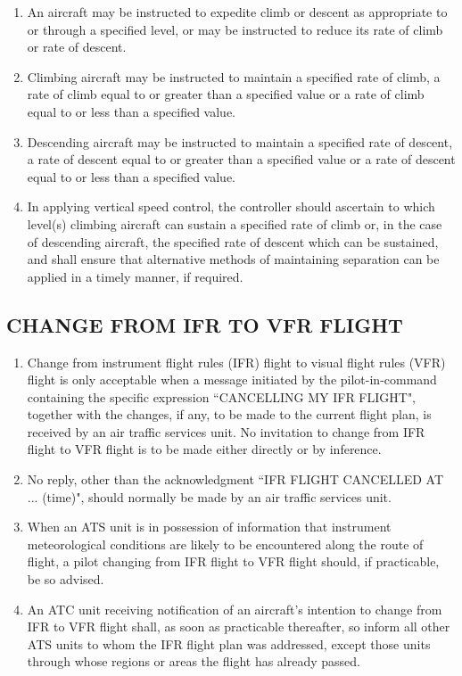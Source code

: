 \documentclass[../vATM.tex]{subfiles}
\begin{document}
    \begin{enumerate}
        \item An aircraft may be instructed to expedite climb or descent as appropriate to or through a specified level, or may be instructed to reduce its rate of climb or rate of descent.
        \item Climbing aircraft may be instructed to maintain a specified rate of climb, a rate of climb equal to or greater than a specified value or a rate of climb equal to or less than a specified value.
        \item Descending aircraft may be instructed to maintain a specified rate of descent, a rate of descent equal to or greater than a specified value or a rate of descent equal to or less than a specified value.
        \item In applying vertical speed control, the controller should ascertain to which level(s) climbing aircraft can sustain a specified rate of climb or, in the case of descending aircraft, the specified rate of descent which can be sustained, and shall ensure that alternative methods of maintaining separation can be applied in a timely manner, if required.
    \end{enumerate}

    \subsection[Change from IFR to VFR flight]{CHANGE FROM IFR TO VFR FLIGHT}

    \begin{enumerate}[label=\arabic{section}.\arabic{subsection}.\arabic*]
        \item Change from instrument flight rules (IFR) flight to visual flight rules (VFR) flight is only acceptable when a message initiated by the pilot-in-command containing the specific expression ``CANCELLING MY IFR FLIGHT", together with the changes, if any, to be made to the current flight plan, is received by an air traffic services unit. No invitation to change from IFR flight to VFR flight is to be made either directly or by inference.
        \item No reply, other than the acknowledgment ``IFR FLIGHT CANCELLED AT ... (time)", should normally be made by an air traffic services unit.
        \item When an ATS unit is in possession of information that instrument meteorological conditions are likely to be encountered along the route of flight, a pilot changing from IFR flight to VFR flight should, if practicable, be so advised.
        \item An ATC unit receiving notification of an aircraft's intention to change from IFR to VFR flight shall, as soon as practicable thereafter, so inform all other ATS units to whom the IFR flight plan was addressed, except those units through whose regions or areas the flight has already passed.
    \end{enumerate}
\end{document}
